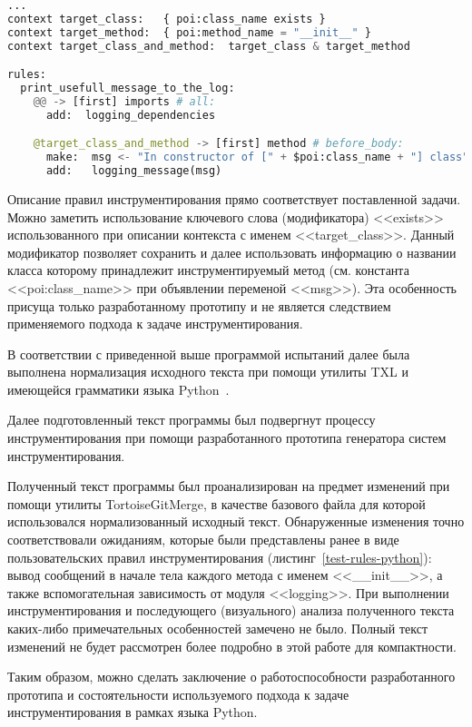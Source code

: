 \begin{lstlisting}[frame=single, language=Python, label={test-rules-python}, caption={Описание правил инструментирования. Python-проект.}]
...
context target_class:   { poi:class_name exists }
context target_method:  { poi:method_name = "__init__" }
context target_class_and_method:  target_class & target_method

rules:
  print_usefull_message_to_the_log:
    @@ -> [first] imports # all:
      add:  logging_dependencies

    @target_class_and_method -> [first] method # before_body:
      make:  msg <- "In constructor of [" + $poi:class_name + "] class";
      add:   logging_message(msg)
\end{lstlisting}

Описание правил инструментирования прямо соответствует поставленной задачи.
Можно заметить использование ключевого слова (модификатора) <<exists>> использованного при описании контекста с именем <<target\_class>>.
Данный модификатор позволяет сохранить и далее использовать информацию о названии класса которому принадлежит инструментируемый метод (см. константа <<poi:class\_name>> при объявлении переменой <<msg>>).
Эта особенность присуща только разработанному прототипу и не является следствием применяемого подхода к задаче инструментирования.

В соответствии с приведенной выше программой испытаний далее была выполнена нормализация исходного текста при помощи утилиты TXL и имеющейся грамматики языка Python~\cite{txl-resources}.

Далее подготовленный текст программы был подвергнут процессу инструментирования при помощи разработанного прототипа генератора систем инструментирования.

Полученный текст программы был проанализирован на предмет изменений при помощи утилиты TortoiseGitMerge, в качестве базового файла для которой использовался нормализованный исходный текст.
Обнаруженные изменения точно соответствовали ожиданиям, которые были представлены ранее в виде пользовательских правил инструментирования (листинг~\ref{test-rules-python}):
вывод сообщений в начале тела каждого метода с именем <<\_\_init\_\_>>,
а также вспомогательная зависимость от модуля <<logging>>.
При выполнении инструментирования и последующего (визуального) анализа полученного текста каких-либо примечательных особенностей замечено не было.
Полный текст изменений не будет рассмотрен более подробно в этой работе для компактности.

Таким образом, можно сделать заключение о работоспособности разработанного прототипа и состоятельности используемого подхода к задаче инструментирования в рамках языка Python.

